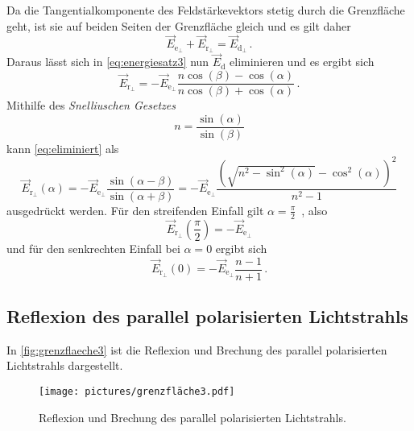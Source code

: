 Da die Tangentialkomponente des Feldstärkevektors stetig durch die Grenzfläche geht,
ist sie auf beiden Seiten der Grenzfläche gleich und es gilt daher
\begin{equation}
    \vec{E}_{\mathrm{e}_{\perp}}+\vec{E}_{\mathrm{r}_{\perp}}=\vec{E}_{\mathrm{d}_{\perp}} \, .
\end{equation}
Daraus lässt sich in \autoref{eq:energiesatz3} nun $\vec{E}_\text{d}$ eliminieren und es ergibt sich
\begin{equation} \label{eq:eliminiert}
    \vec{E}_{\mathrm{r}_{\perp}}=-\vec{E}_{\mathrm{e}_{\perp}} \frac{n \cos (\beta)-\cos (\alpha)}{n \cos (\beta)+\cos (\alpha)} \, .
\end{equation}
Mithilfe des \textit{Snelliuschen Gesetzes}
\begin{equation} \label{eq:snellius}
    n=\frac{\sin (\alpha)}{\sin (\beta)}
\end{equation}
kann \autoref{eq:eliminiert} als
\begin{equation} \label{eq:r_senkrecht}
    \vec{E}_{\mathrm{r}_{\perp}}(\alpha) 
    = -\vec{E}_{\mathrm{e}_{\perp}} \frac{\sin (\alpha-\beta)}{\sin (\alpha+\beta)}
    = -\vec{E}_{\mathrm{e}_{\perp}} \frac{\left(\sqrt{n^{2}-\sin ^{2}(\alpha)}-\cos ^{2}(\alpha)\right)^{2}}{n^{2}-1}
\end{equation}
ausgedrückt werden. Für den streifenden Einfall gilt $\alpha = \frac{\pi}{2} \,$ , also 
\begin{equation*}
    \vec{E}_{\mathrm{r}_{\perp}}\left(\frac{\pi}{2}\right)=-\vec{E}_{\mathrm{e}_{\perp}}
\end{equation*}
und für den senkrechten Einfall bei $\alpha = 0$ ergibt sich
\begin{equation*}
    \vec{E}_{\mathrm{r}_{\perp}}(0)=-\vec{E}_{\mathrm{e}_{\perp}} \frac{n-1}{n+1} \, .
\end{equation*}


\subsection{Reflexion des parallel polarisierten Lichtstrahls}

In \autoref{fig:grenzflaeche3} ist die Reflexion und Brechung des parallel polarisierten Lichtstrahls dargestellt.
\begin{figure}[ht]
    \centering
    \texttt{[image: pictures/grenzfläche3.pdf]}
    \caption{Reflexion und Brechung des parallel polarisierten Lichtstrahls. \cite{v407}}
    \label{fig:grenzflaeche3}
\end{figure}

